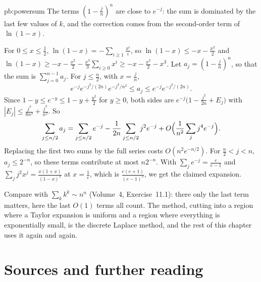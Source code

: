\begin{solution}{pb:powersum}
\idea The terms $(1-\frac jn)^n$ are close to $e^{-j}$: the sum is dominated by the last few values of $k$, and the correction comes from the second-order term
of $\ln(1-x)$.

\writeup For $0\le x\le\frac12$, $\ln(1-x)=-\sum_{i\ge1}\frac{x^i}i$, so $\ln(1-x)\le-x-\frac{x^2}2$ and $\ln(1-x)\ge-x-\frac{x^2}2-\frac{x^3}3\sum_{i\ge0}x^i\ge-x-\frac{x^2}2-x^3$. Let
$a_j=(1-\frac jn)^n$, so that the sum is $\sum_{j=0}^{n-1}a_j$. For $j\le\frac n2$, with $x=\frac jn$,
\[
e^{-j}e^{-j^2/(2n)}e^{-j^3/n^2}\le a_j\le e^{-j}e^{-j^2/(2n)}.
\]
Since $1-y\le e^{-y}\le1-y+\frac{y^2}2$ for $y\ge0$, both sides are $e^{-j}\bigl(1-\frac{j^2}{2n}+E_j\bigr)$ with $|E_j|\le\frac{j^4}{8n^2}+\frac{j^3}{n^2}$. So
\[
\sum_{j\le n/2}a_j=\sum_{j\le n/2}e^{-j}-\frac1{2n}\sum_{j\le n/2}j^2e^{-j}+O\Bigl(\frac1{n^2}\sum_jj^4e^{-j}\Bigr).
\]
Replacing the first two sums by the full series costs $O(n^2e^{-n/2})$. For $\frac n2<j<n$, $a_j\le2^{-n}$, so these terms contribute at most $n2^{-n}$. With
$\sum_je^{-j}=\frac e{e-1}$ and $\sum_jj^2x^j=\frac{x(1+x)}{(1-x)^3}$ at $x=\frac1e$, which is $\frac{e(e+1)}{(e-1)^3}$, we get the claimed expansion.

\leads Compare with $\sum_kk^k\sim n^n$ (Volume~4, Exercise~11.1): there only the last term matters, here the last $O(1)$ terms all count. The method,
cutting into a region where a Taylor expansion is uniform and a region where everything is exponentially small, is the discrete
Laplace method, and the rest of this chapter uses it again and again.
\end{solution}

\section*{Sources and further reading}

